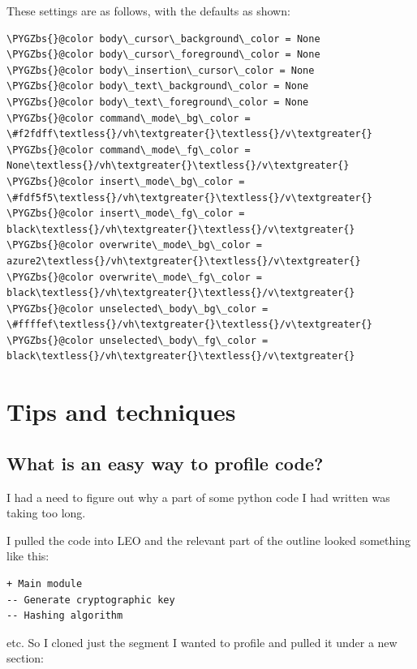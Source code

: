 \documentclass[a4paper,10pt,english]{sphinxmanual}
\def\PYGZbs{\char`\\}
\begin{document}
These settings are as follows, with the defaults as shown:

\begin{Verbatim}[commandchars=\\\{\}]
\PYGZbs{}@color body\_cursor\_background\_color = None
\PYGZbs{}@color body\_cursor\_foreground\_color = None
\PYGZbs{}@color body\_insertion\_cursor\_color = None
\PYGZbs{}@color body\_text\_background\_color = None
\PYGZbs{}@color body\_text\_foreground\_color = None
\PYGZbs{}@color command\_mode\_bg\_color = \#f2fdff\textless{}/vh\textgreater{}\textless{}/v\textgreater{}
\PYGZbs{}@color command\_mode\_fg\_color = None\textless{}/vh\textgreater{}\textless{}/v\textgreater{}
\PYGZbs{}@color insert\_mode\_bg\_color = \#fdf5f5\textless{}/vh\textgreater{}\textless{}/v\textgreater{}
\PYGZbs{}@color insert\_mode\_fg\_color = black\textless{}/vh\textgreater{}\textless{}/v\textgreater{}
\PYGZbs{}@color overwrite\_mode\_bg\_color = azure2\textless{}/vh\textgreater{}\textless{}/v\textgreater{}
\PYGZbs{}@color overwrite\_mode\_fg\_color = black\textless{}/vh\textgreater{}\textless{}/v\textgreater{}
\PYGZbs{}@color unselected\_body\_bg\_color = \#ffffef\textless{}/vh\textgreater{}\textless{}/v\textgreater{}
\PYGZbs{}@color unselected\_body\_fg\_color = black\textless{}/vh\textgreater{}\textless{}/v\textgreater{}
\end{Verbatim}


\section{Tips and techniques}
\label{FAQ:tips-and-techniques}

\subsection{What is an easy way to profile code?}
\label{FAQ:what-is-an-easy-way-to-profile-code}
I had a need to figure out why a part of some python code I had written
was taking too long.

I pulled the code into LEO and the relevant part of the outline looked
something like this:

\begin{Verbatim}[commandchars=\\\{\}]
+ Main module
-- Generate cryptographic key
-- Hashing algorithm
\end{Verbatim}

etc. So I cloned just the segment I wanted to profile and pulled it under a new
section:
\end{document}
